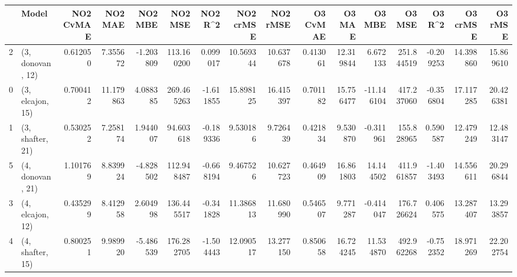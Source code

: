 \begin{tabular}{llrrrrrrrrrrrrrr}
\toprule
{} &             Model &  NO2 CvMAE &    NO2 MAE &   NO2 MBE &     NO2 MSE &   NO2 R\textasciicircum2 &  NO2 crMSE &   NO2 rMSE &  O3 CvMAE &     O3 MAE &     O3 MBE &      O3 MSE &    O3 R\textasciicircum2 &   O3 crMSE &    O3 rMSE \\
\midrule
2 &  (3, donovan, 12) &   0.612050 &   7.355672 & -1.203809 &  113.160200 &  0.099017 &  10.569344 &  10.637678 &  0.413061 &  12.319844 &   6.672133 &  251.844519 & -0.209253 &  14.398860 &  15.869610 \\
0 &  (3, elcajon, 15) &   0.700412 &  11.179863 &  4.088385 &  269.465263 & -1.611855 &  15.898125 &  16.415397 &  0.701182 &  15.756477 & -11.146104 &  417.237060 & -0.356804 &  17.117285 &  20.426381 \\
1 &  (3, shafter, 21) &   0.530252 &   7.258174 &  1.944007 &   94.603618 & -0.189336 &   9.530186 &   9.726439 &  0.421834 &   9.530870 &  -0.311961 &  155.828965 &  0.590587 &  12.479249 &  12.483147 \\
5 &  (4, donovan, 21) &   1.101769 &   8.839924 & -4.828502 &  112.948487 & -0.668194 &   9.467526 &  10.627723 &  0.464909 &  16.861803 &  14.144502 &  411.961857 & -1.403493 &  14.556611 &  20.296844 \\
3 &  (4, elcajon, 12) &   0.435299 &   8.412958 &  2.604998 &  136.445517 & -0.341828 &  11.386813 &  11.680990 &  0.546507 &   9.771287 &  -0.414047 &  176.726624 &  0.406575 &  13.287407 &  13.293857 \\
4 &  (4, shafter, 15) &   0.800251 &   9.989920 & -5.486539 &  176.282705 & -1.504443 &  12.090517 &  13.277150 &  0.850658 &  16.724245 &  11.534870 &  492.962268 & -0.752352 &  18.971269 &  22.202754 \\
\bottomrule
\end{tabular}
